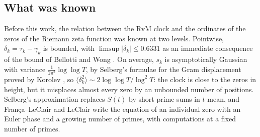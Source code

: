 \documentclass[preprint,12pt]{elsarticle}
\numberwithin{equation}{section}
\theoremstyle{plain}
\theoremstyle{definition}
\theoremstyle{remark}
\begin{document}
\subsection{What was known}
Before this work, the relation between the RvM clock and the ordinates of the zeros of the Riemann zeta function was known at two levels. Pointwise, $\delta_k=\tau_k-\gamma_k$ is bounded, with $\limsup|\delta_k|\le0.6331$ as an immediate consequence of the bound of Bellotti and Wong \cite{BellottiWong2025}. On average, $s_k$ is asymptotically Gaussian with variance $\frac1{2\pi^2}\log\log T$, by Selberg's formulae for the Gram displacement proved by Korolev \cite{Korolev2012,Korolev2011}, so $\langle\delta_k^2\rangle\sim2\log\log T/\log^2T$: the clock is close to the zeros in height, but it misplaces almost every zero by an unbounded number of positions. Selberg's approximation \cite{Selberg1946a,Fujii1974} replaces $S(t)$ by short prime sums in $t$-mean, and Fran\c{c}a--LeClair and LeClair \cite{FrancaLeClair2015,LeClair2021,FrancaLeClair2024} write the equation of an individual zero with an Euler phase and a growing number of primes, with computations at a fixed number of primes.
\end{document}
